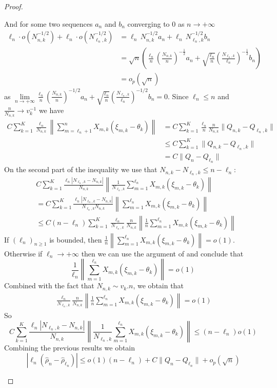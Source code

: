 \begin{proof}
\begin{enumerate}[label=(\roman*)]
		And for some two sequences $a_n$ and $b_n$ converging to $0$ as $n \to + \infty$
		\begin{align*}
			\ell_n\cdot o\left(N_{n,k}^{-1/2}\right)+\ell_n\cdot o\left(N_{\ell_n,k}^{-1/2}\right)
			&= \ell_n\,N_{n,k}^{-1/2}a_n + \ell_n \,N_{\ell_n,k}^{-1/2}b_n\\
			&= \sqrt{n}\left(\frac{\ell_n}{n}\left(\frac{N_{n,k}}{n}\right)^{-\frac{1}{2}}a_{n} + \sqrt{\frac{\ell_n}{n}}\left(\frac{N_{\ell_n,k}}{\ell_n}\right)^{-\frac{1}{2}}b_{n}\right)\\
			&= o_p(\sqrt{n})
		\end{align*}	
		as \quad \(\lim\limits_{n\to+\infty} \frac{\ell_n}{n}\left(\frac{N_{n,k}}{n}\right)^{-1/2}a_n + \sqrt{\frac{\ell_n}{n}}\left(\frac{N_{\ell_n,k}}{\ell_n}\right)^{-1/2}b_n=0\)\;. Since \(\ell_n \le n\) and \(\frac{n}{N_{n,k}}\to v_k^{-1}\) we have
		\begin{align*}
			C\sum_{k=1}^{K}\frac{\ell_n}{N_{n,k}}\left\|\sum_{m=\ell_n+1}^{n}X_{m,k}(\xi_{m,k}-\theta_k)\right\|
			&=C\sum_{k=1}^{K}\frac{\ell_n}{n}\frac{n}{N_{n,k}}\|Q_{n,k}-Q_{\ell_n,k}\|\\
			&\le C\sum_{k=1}^{K}\|Q_{n,k}-Q_{\ell_n,k}\|\\
			&= C\|Q_n-Q_{\ell_n}\|
		\end{align*}	
		On the second part of the inequality we use that \(N_{n,k} - N_{\ell_{n}, k} \leq n - \ell_n\):
		\begin{align*}
			&C\sum_{k=1}^{K}\frac{\ell_n|N_{\ell_n,k}-N_{n,k}|}{N_{n,k}}\left\|\frac{1}{N_{\ell_n,k}}\sum_{m=1}^{\ell_n}X_{m,k}(\xi_{m,k}-\theta_k)\right\|\\&= C\sum_{k=1}^{K}\frac{\ell_n|N_{\ell_n,k}-N_{n,k}|}{N_{\ell_n,k}N_{n,k}}\left\|\sum_{m=1}^{\ell_n}X_{m,k}(\xi_{m,k}-\theta_k)\right\|\\
			& \leq C(n-\ell_n) \sum_{k=1}^{K}\frac{\ell_n}{N_{\ell_n,k}}\frac{n}{N_{n,k}} \left\|\frac{1}{n}\sum_{m=1}^{\ell_n}X_{m,k}(\xi_{m,k}-\theta_k)\right\|
		\end{align*}
		If \((\ell_{n})_{n\geq1}\) is bounded, then \(\frac{1}{n}\left\|\sum_{m=1}^{\ell_n}X_{m,k}(\xi_{m,k}-\theta_k)\right\| = o(1)\). Otherwise if \(\ell_n \to +\infty\) then we can use the argument of \cite{Doob1936} and conclude that
		\[\frac{1}{\ell_n}\left\|\sum_{m=1}^{\ell_n}X_{m,k}(\xi_{m,k}-\theta_k)\right\| = o(1)\]
		Combined with the fact that \(N_{n,k} \sim v_k.n\), we obtain that
		\begin{align*}
			\frac{\ell_n}{N_{\ell_n,k}}\frac{n}{N_{n,k}}\left\|\frac{1}{n}\sum_{m=1}^{\ell_n}X_{m,k}(\xi_{m,k}-\theta_k)\right\| = o(1)
		\end{align*}
		So
		\begin{equation*}
			C\sum_{k=1}^{K}\frac{\ell_n|N_{\ell_n,k}-N_{n,k}|}{N_{n,k}}\left\|\frac{1}{N_{\ell_n,k}}\sum_{m=1}^{\ell_n}X_{m,k}(\xi_{m,k}-\theta_k)\right\| \leq (n-\ell_n) o(1)
		\end{equation*}
		Combining the previous results we obtain
		\[
		|\ell_n(\hat{\rho}_n - \hat{\rho}_{\ell_n})| \le o(1)(n-\ell_n) + C\|Q_n - Q_{\ell_n}\| + o_p(\sqrt{n})
		\]
	\end{enumerate}
\end{proof}

